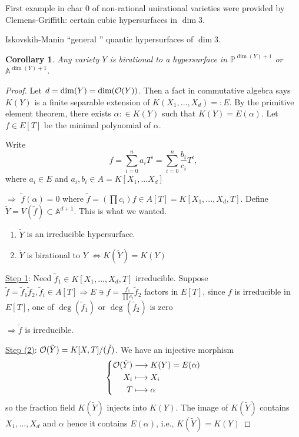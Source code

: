 \documentclass[11pt]{article}
\newtheorem{cor}[thm]{Corollary}
\newcommand{\affn}{\mathbb A}
\newcommand{\proj}{\mathbb P}
\newcommand{\calo}{{\cal O}}
\newcommand{\Lrta}{\Longrightarrow}
\newcommand{\lrta}{\longrightarrow}
\newcommand{\Llrta}{\Longleftrightarrow}
\begin{document}
First example in char $0$ of non-rational unirational varieties were provided by Clemens-Griffith: certain cubic hypersurfaces in $\dim 3$. 

Iskovskih-Manin ``general '' quantic hypersurfaces of $\dim 3$.

\begin{cor}
Any variety $Y$ is birational to a hypersurface in $\proj^{\dim(Y)+1}$ or $\affn^{\dim(Y)+1}$.
\end{cor}
\begin{proof}
Let $d=\dim(Y)=\dim(\calo(Y))$. Then a fact in commutative algebra says $K(Y)$ is a finite separable extension of $K(X_1,...,X_d)=:E$. By the primitive element theorem, there exists $\alpha:\in K(Y)$ such that  $K(Y)=E(\alpha)$. Let $f\in E[T]$ be the minimal polynomial of $\alpha$.

Write
$$
f=\sum_{i=0}^na_i T^i=\sum_{i=0}^n \frac{b_i}{c_i} T^i,
$$
where $a_i\in E$ and $a_i, b_i\in A=K[X_1,...X_d]$

$\Lrta$ $\tilde{f}(\alpha)=0$ where $\tilde{f}=\left(\prod c_i\right)f\in A[T]=K[X_1,...,X_d,T]$. Define $\tilde{Y}=V(\tilde{f})\subset \affn^{d+1}$. This is what we wanted.
\begin{enumerate}[label=(\arabic*)]
\item $\tilde{Y}$ is an irreducible hypersurface.
\item $\tilde{Y}$ is birational to $Y$ $\Llrta K(\tilde{Y})=K(Y)$
\end{enumerate}

\underline{Step 1}: Need $\tilde{f}_1\in K[X_1,...,X_d,T]$ irreducible. Suppose $\tilde{f}=\tilde{f}_1\tilde{f}_2, \tilde{f}_i\in A[T]\Lrta E\ni f=\frac{\tilde{f}_1}{\prod c_i}\tilde{f}_2 $ factors in $E[T]$, since $f$ is irreducible in  $E[T]$, one of $\deg(\tilde{f}_1)$ or $\deg(\tilde{f}_2)$ is zero

$\Lrta \tilde{f}$ is irreducible.

\underline{Step (2)}: $\calo(\tilde{Y})=K[X,T]/(\tilde{f})$. We have an injective morphism
$$
\left\{\begin{aligned}
 \calo(\tilde{Y})&\lrta K(Y)=E(\alpha)\\
 X_i&\longmapsto X_i\\
 T&\longmapsto \alpha
\end{aligned}
\right.
$$
so the fraction field $K(\tilde{Y})$ injects into $K(Y)$. The image of $K(\tilde{Y})$ contains $X_1,...,X_d$ and $\alpha$ hence it contains $E(\alpha)$, i.e., $K(\tilde{Y})=K(Y)$
\end{proof}
\end{document}
